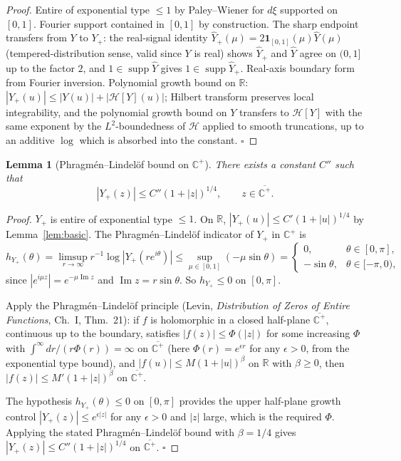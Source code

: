\documentclass[11pt]{article}
\newtheorem{lemma}[theorem]{Lemma}
\theoremstyle{definition}
\newcommand{\R}{\mathbb{R}}
\newcommand{\C}{\mathbb{C}}
\newcommand{\Cp}{\C^{+}}
\newcommand{\HH}{\mathcal{H}}
\newcommand{\supp}{\operatorname{supp}}
\begin{document}
\begin{proof}
Entire of exponential type $\le 1$ by Paley--Wiener for $d\xi$ supported on $[0,1]$. Fourier support contained in $[0,1]$ by construction. The sharp endpoint transfers from $Y$ to $Y_+$: the real-signal identity $\hat Y_+(\mu)=2\mathbf 1_{[0,1]}(\mu)\hat Y(\mu)$ (tempered-distribution sense, valid since $Y$ is real) shows $\hat Y_+$ and $\hat Y$ agree on $(0,1]$ up to the factor $2$, and $1\in\supp\hat Y$ gives $1\in\supp\hat Y_+$. Real-axis boundary form from Fourier inversion. Polynomial growth bound on $\R$: $|Y_+(u)|\le|Y(u)|+|\HH[Y](u)|$; Hilbert transform preserves local integrability, and the polynomial growth bound on $Y$ transfers to $\HH[Y]$ with the same exponent by the $L^2$-boundedness of $\HH$ applied to smooth truncations, up to an additive $\log$ which is absorbed into the constant. $\square$
\end{proof}

\begin{lemma}[Phragmén--Lindelöf bound on $\Cp$]\label{lem:PL}
There exists a constant $C''$ such that
\[
|Y_+(z)|\le C''(1+|z|)^{1/4},\qquad z\in\overline{\Cp}.
\]
\end{lemma}

\begin{proof}
$Y_+$ is entire of exponential type $\le 1$. On $\R$, $|Y_+(u)|\le C'(1+|u|)^{1/4}$ by Lemma~\ref{lem:basic}. The Phragmén--Lindelöf indicator of $Y_+$ in $\Cp$ is
\[
h_{Y_+}(\theta)=\limsup_{r\to\infty}r^{-1}\log|Y_+(re^{i\theta})|\le\sup_{\mu\in[0,1]}(-\mu\sin\theta)=\begin{cases}0,&\theta\in[0,\pi],\\-\sin\theta,&\theta\in[-\pi,0),\end{cases}
\]
since $|e^{i\mu z}|=e^{-\mu\operatorname{Im}z}$ and $\operatorname{Im}z=r\sin\theta$. So $h_{Y_+}\le 0$ on $[0,\pi]$.

Apply the Phragmén--Lindelöf principle (Levin, \emph{Distribution of Zeros of Entire Functions}, Ch.~I, Thm.~21): if $f$ is holomorphic in a closed half-plane $\overline{\Cp}$, continuous up to the boundary, satisfies $|f(z)|\le\Phi(|z|)$ for some increasing $\Phi$ with $\int^\infty dr/(r\Phi(r))=\infty$ on $\overline{\Cp}$ (here $\Phi(r)=e^{\epsilon r}$ for any $\epsilon>0$, from the exponential type bound), and $|f(u)|\le M(1+|u|)^{\beta}$ on $\R$ with $\beta\ge 0$, then $|f(z)|\le M'(1+|z|)^\beta$ on $\overline{\Cp}$.

The hypothesis $h_{Y_+}(\theta)\le 0$ on $[0,\pi]$ provides the upper half-plane growth control $|Y_+(z)|\le e^{\epsilon|z|}$ for any $\epsilon>0$ and $|z|$ large, which is the required $\Phi$. Applying the stated Phragmén--Lindelöf bound with $\beta=1/4$ gives $|Y_+(z)|\le C''(1+|z|)^{1/4}$ on $\overline{\Cp}$. $\square$
\end{proof}
\end{document}
